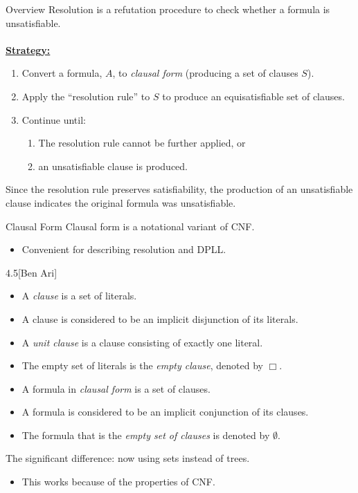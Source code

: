 \begin{wideslide}[bm=,toc=]{Overview}
Resolution is a refutation procedure to check whether a formula is
unsatisfiable.\\
~\\
{\bf \underline{Strategy:}}\\
\begin{enumerate}
\item Convert a formula, $A$, to \emph{clausal form} (producing a set of clauses $S$).
\item Apply the ``resolution rule'' to $S$ to produce an equisatisfiable set of
clauses.
\item Continue until:
\begin{enumerate}
\item The resolution rule cannot be further applied, or
\item an unsatisfiable clause is produced.
\end{enumerate}
\end{enumerate}
Since the resolution rule preserves satisfiability, the production of an
unsatisfiable clause indicates the original formula was unsatisfiable.
\end{wideslide}

\begin{wideslide}[bm=,toc=]{Clausal Form}
Clausal form is a notational variant of CNF.
\begin{itemize}
\item Convenient for describing resolution and DPLL.
\end{itemize}

\begin{defn}{4.5}[Ben Ari]
\end{defn}
\vspace*{-3ex}
\begin{itemize}
\item A \emph{clause} is a set of literals.  
\item A clause is considered to be an implicit disjunction of its literals.
\item A \emph{unit clause} is a clause consisting of exactly one literal.
\item The empty set of literals is the \emph{empty clause}, denoted by $\Box$.
\item A formula in \emph{clausal form} is a set of clauses.
\item A formula is considered to be an implicit conjunction of its clauses.
\item The formula that is the \emph{empty set of clauses} is denoted by
$\emptyset$.
\end{itemize}

The significant difference: now using sets instead of trees.
\begin{itemize}
\item This works because of the properties of CNF. 
\end{itemize}
\end{wideslide}

